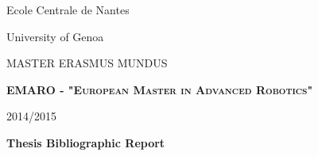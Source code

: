\documentclass[11pt, openright]{Thesis} %
\begin{document}
\begin{titlepage}
\singlespacing
     \noindent \begin{minipage}{0.5\textwidth}
	\begin{flushleft} 
	{\large Ecole Centrale de Nantes}
	\end{flushleft}
	\end{minipage}
	\begin{minipage}{0.5\textwidth}
	\begin{flushright}
	{\large University of Genoa}
    \end{flushright}	 
	\end{minipage}
\begin{figure}[H]
\center
\end{figure}
	\begin{center}
	\vspace*{0.2in}
	{\Large MASTER ERASMUS MUNDUS}
	
	\vspace{0.2in}	\textbf{\textsc{EMARO - "European Master in Advanced Robotics"}}
	
	\vspace{0.2in}	
	
	2014/2015
	
	\vspace{0.2in}
	
	\large \textbf{Thesis Bibliographic Report}
	
	\vspace{0.3in}
	

\end{center}
\end{titlepage}
\end{document}

